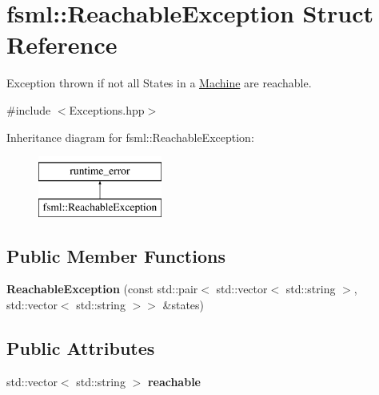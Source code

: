 \hypertarget{structfsml_1_1ReachableException}{\section{fsml\-:\-:Reachable\-Exception Struct Reference}
\label{structfsml_1_1ReachableException}
}


Exception thrown if not all States in a \hyperlink{classfsml_1_1Machine}{Machine} are reachable.  




{\ttfamily \#include $<$Exceptions.\-hpp$>$}

Inheritance diagram for fsml\-:\-:Reachable\-Exception\-:\begin{figure}[H]
\begin{center}
\leavevmode
\includegraphics[height=2.000000cm]{structfsml_1_1ReachableException}
\end{center}
\end{figure}
\subsection*{Public Member Functions}
\begin{DoxyCompactItemize}
\item 
\hypertarget{structfsml_1_1ReachableException_a10ee53b62caeefb43be52d96420d0798}{{\bfseries Reachable\-Exception} (const std\-::pair$<$ std\-::vector$<$ std\-::string $>$, std\-::vector$<$ std\-::string $>$$>$ \&states)}\label{structfsml_1_1ReachableException_a10ee53b62caeefb43be52d96420d0798}

\end{DoxyCompactItemize}
\subsection*{Public Attributes}
\begin{DoxyCompactItemize}
\item 
\hypertarget{structfsml_1_1ReachableException_a6101b6deeeaba35c21944812ab71bf5d}{std\-::vector$<$ std\-::string $>$ {\bfseries reachable}}\label{structfsml_1_1ReachableException_a6101b6deeeaba35c21944812ab71bf5d}

\end{DoxyCompactItemize}


